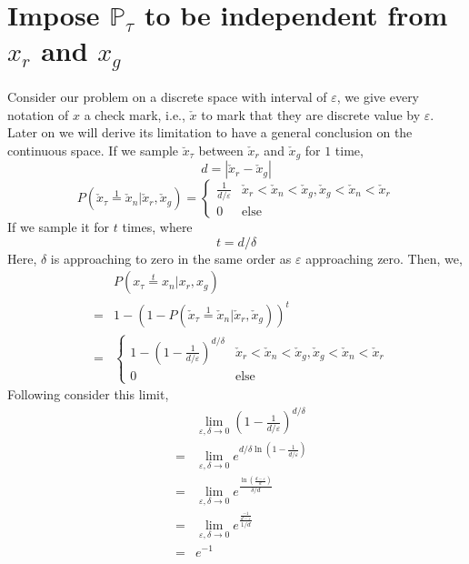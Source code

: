 \documentclass[letterpaper]{article} %
\begin{document}
\section{Impose $\mathbb{P}_{\tau}$ to be independent from $x_r$ and $x_g$}
Consider our problem on a discrete space with interval of $\varepsilon$, we give every notation of $x$ a check mark, i.e., $\check{x}$ to mark that they are discrete value by $\varepsilon$. Later on we will derive its limitation to have a general conclusion on the continuous space. If we sample $\breve{x}_\tau$ between $\check{x}_r$ and $\check{x}_g$ for $1$ time,
\begin{equation}\label{d}
  d=|\check{x}_r-\check{x}_g|
\end{equation}
\begin{equation}\label{p-epsilon-pr-pg}
    P(\check{x}_\tau\overset{1}{=}\check{x}_n|\check{x}_r,\check{x}_g)=
    \begin{cases}
        \frac{1}{d/\varepsilon} &\mbox{$\check{x}_r<\check{x}_n<\check{x}_g,\check{x}_g<\check{x}_n<\check{x}_r$}\\
        0 &\mbox{else}
    \end{cases}
\end{equation}
If we sample it for $t$ times, where
\begin{equation}\label{T}
  t = d/{\delta}
\end{equation}
Here, $\delta$ is approaching to zero in the same order as $\varepsilon$ approaching zero.
Then, we,
\begin{eqnarray}\label{p-epsilon-pr-pg-T}
    && P(x_\tau\overset{t}{=}x_n|x_r,x_g) \nonumber\\
    \nonumber &=& 1 - (1-P(\check{x}_\tau\overset{1}{=}\check{x}_n|\check{x}_r,\check{x}_g))^t \\
    \nonumber &=&
    \begin{cases}
        1 - (1-\frac{1}{d/\varepsilon})^{d/\delta} &\mbox{$\check{x}_r<\check{x}_n<\check{x}_g,\check{x}_g<\check{x}_n<\check{x}_r$}\\
        0 &\mbox{else}
    \end{cases}
\end{eqnarray}
Following consider this limit,
\begin{eqnarray}\label{p-epsilon-pr-pg-T}
    && \lim_{\varepsilon,\delta\rightarrow0} (1-\frac{1}{d/\varepsilon})^{d/\delta} \nonumber\\
    \nonumber &=& \lim_{\varepsilon,\delta\rightarrow0} e^{d/\delta \ln(1-\frac{1}{d/\varepsilon})} \\
    \nonumber &=& \lim_{\varepsilon,\delta\rightarrow0} e^{\frac{\ln(\frac{d-\varepsilon}{d})}{\delta/d}} \\
    \nonumber &=& \lim_{\varepsilon,\delta\rightarrow0} e^{\frac{\frac{-1}{d-\varepsilon}}{1/d}} \\
    \nonumber &=& e^{-1} \\
\end{eqnarray}
\end{document}
